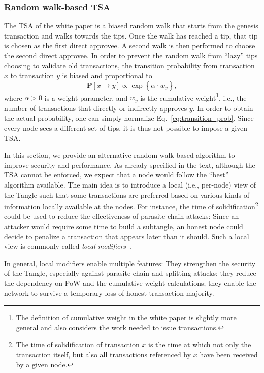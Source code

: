 \documentclass[../main.tex]{subfiles}
\begin{document}
\subsubsection{Random walk-based TSA}\label{sec:tsa_rw}

The TSA of the white paper is a biased random walk that starts from the genesis transaction and walks towards the tips. Once the walk has reached a tip, that tip is chosen as the first direct approvee. A second walk is then performed to choose the second direct approvee. In order to prevent the random walk from ``lazy'' tips choosing to validate old transactions, the transition probability from transaction $x$ to transaction $y$ is biased and proportional to
\begin{equation}\label{eq:transition_prob}
    \mathbf{P}[x\rightarrow y] \propto \exp\left\{\alpha\cdot w_y\right\},
\end{equation}
where $\alpha>0$ is a weight parameter, and $w_y$ is the cumulative weight\footnote{The definition of cumulative weight in the white paper is slightly more general and also considers the work needed to issue transactions.}, i.e., the number of transactions that directly or indirectly approves $y$. In order to obtain the actual probability, one can simply normalize Eq.~\eqref{eq:transition_prob}. Since every node sees a different set of tips, it is thus not possible to impose a given TSA.

In this section, we provide an alternative random walk-based algorithm to improve security and performance. As already specified in the text, although the TSA cannot be enforced, we expect that a node would follow the ``best'' algorithm available. The main idea is to introduce a local (i.e., per-node) view of the Tangle such that some transactions are preferred based on various kinds of information locally available at the nodes. For instance, the time of solidification\footnote{The time of solidification of transaction $x$ is the time at which not only the transaction itself, but also all transactions referenced by $x$ have been received by a given node.} could be used to reduce the effectiveness of parasite chain attacks:
Since an attacker would require some time to build a subtangle, an honest node could decide to penalize a transaction that appears later than it should. Such a local view is commonly called \textit{local modifiers}~\cite{popov2018lm}.

In general, local modifiers enable multiple features: They strengthen the security of the Tangle, especially against parasite chain and splitting attacks; they reduce the dependency on PoW and the cumulative weight calculations; they enable the network to survive a temporary loss of honest transaction majority.
\end{document}
